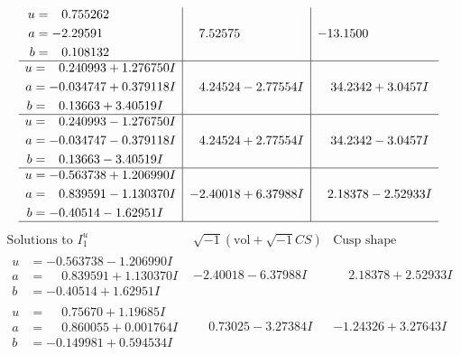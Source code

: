 \documentclass[1p]{elsarticle_modified}
\theoremstyle{definition}
\newcommand{\I}{\sqrt{-1}}
\begin{document}
$$\begin{array}{c|c|c}
\begin{aligned}
u &= \phantom{-}0.755262\phantom{ +0.000000I} \\
a &= -2.29591\phantom{ +0.000000I} \\
b &= \phantom{-}0.108132\phantom{ +0.000000I}\end{aligned}
 & \phantom{-}7.52575\phantom{ +0.000000I} & -13.1500\phantom{ +0.000000I} \\ \hline\begin{aligned}
u &= \phantom{-}0.240993 + 1.276750 I \\
a &= -0.034747 + 0.379118 I \\
b &= \phantom{-}0.13663 + 3.40519 I\end{aligned}
 & \phantom{-}4.24524 - 2.77554 I & \phantom{-}34.2342 + 3.0457 I \\ \hline\begin{aligned}
u &= \phantom{-}0.240993 - 1.276750 I \\
a &= -0.034747 - 0.379118 I \\
b &= \phantom{-}0.13663 - 3.40519 I\end{aligned}
 & \phantom{-}4.24524 + 2.77554 I & \phantom{-}34.2342 - 3.0457 I \\ \hline\begin{aligned}
u &= -0.563738 + 1.206990 I \\
a &= \phantom{-}0.839591 - 1.130370 I \\
b &= -0.40514 - 1.62951 I\end{aligned}
 & -2.40018 + 6.37988 I & \phantom{-}2.18378 - 2.52933 I\\
 \hline 
 \end{array}$$\newpage$$\begin{array}{c|c|c}  
\text{Solutions to }I^u_{1}& \I (\text{vol} + \sqrt{-1}CS) & \text{Cusp shape}\\
 \hline 
\begin{aligned}
u &= -0.563738 - 1.206990 I \\
a &= \phantom{-}0.839591 + 1.130370 I \\
b &= -0.40514 + 1.62951 I\end{aligned}
 & -2.40018 - 6.37988 I & \phantom{-}2.18378 + 2.52933 I \\ \hline\begin{aligned}
u &= \phantom{-}0.75670 + 1.19685 I \\
a &= \phantom{-}0.860055 + 0.001764 I \\
b &= -0.149981 + 0.594534 I\end{aligned}
 & \phantom{-}0.73025 - 3.27384 I & -1.24326 + 3.27643 I \\ \hline\begin{aligned}

\end{aligned}
\end{array}$$
\end{document}
